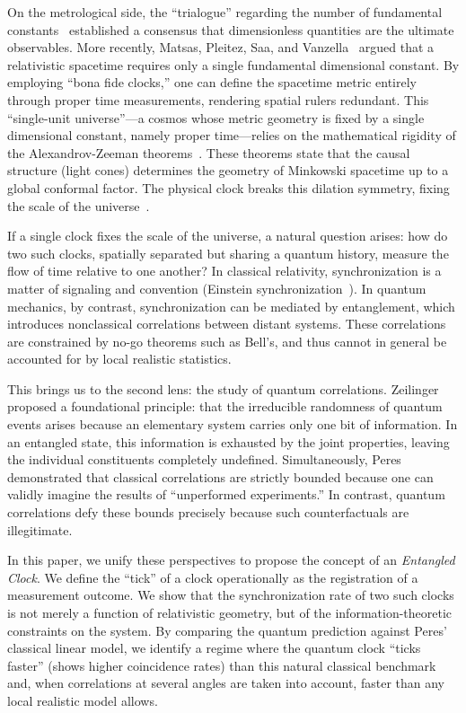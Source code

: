 \documentclass[entropy,article,submit,moreauthors,pdftex]{Definitions/mdpi}
\begin{document}
On the metrological side, the ``trialogue'' regarding the number of fundamental constants~\cite{DuffOkunVeneziano} established a consensus that dimensionless quantities are the ultimate observables. More recently, Matsas, Pleitez, Saa, and Vanzella~\cite{matsas-2024} argued that a relativistic spacetime requires only a single fundamental dimensional constant. By employing ``bona fide clocks,'' one can define the spacetime metric entirely through proper time measurements, rendering spatial rulers redundant.
This ``single-unit universe''---a cosmos whose metric geometry is fixed by
a single dimensional constant, namely proper time---relies on the mathematical rigidity of the Alexandrov-Zeeman theorems~\cite{alex3,zeeman}. These theorems state that the causal structure (light cones) determines the geometry of Minkowski spacetime up to a global conformal factor. The physical clock breaks this dilation symmetry, fixing the scale of the universe~\cite{svozil-2025-lt}.

If a single clock fixes the scale of the universe, a natural question arises: how do two such clocks, spatially separated but sharing a quantum history, measure the flow of time relative to one another? In classical relativity, synchronization is a matter of signaling and convention (Einstein synchronization~\cite{ein-05}). In quantum mechanics, by contrast, synchronization can be mediated by entanglement, which introduces nonclassical correlations between distant systems. These correlations are constrained by no-go theorems such as Bell's, and thus cannot in general be accounted for by local realistic statistics.

This brings us to the second lens: the study of quantum correlations. Zeilinger~\cite{zeil-99} proposed a foundational principle: that the irreducible randomness of quantum events arises because an elementary system carries only one bit of information. In an entangled state, this information is exhausted by the joint properties, leaving the individual constituents completely undefined. Simultaneously, Peres~\cite{peres222} demonstrated that classical correlations are strictly bounded because one can validly imagine the results of ``unperformed experiments.'' In contrast, quantum correlations defy these bounds precisely because such counterfactuals are illegitimate.

In this paper, we unify these perspectives to propose the concept of an \emph{Entangled Clock}. We define the ``tick'' of a clock operationally as the registration of a measurement outcome. We show that the synchronization rate of two such clocks is not merely a function of relativistic geometry, but of the information-theoretic constraints on the system. By comparing the quantum prediction against Peres' classical linear model, we identify a regime where the quantum clock ``ticks faster'' (shows higher coincidence rates) than this natural classical benchmark and, when correlations at several angles are taken into account, faster than any local realistic model allows.
\end{document}
